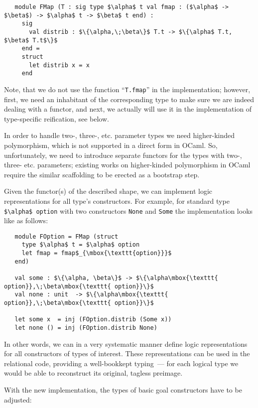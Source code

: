\begin{lstlisting}
   module FMap (T : sig type $\alpha$ t val fmap : ($\alpha$ -> $\beta$) -> $\alpha$ t -> $\beta$ t end) :
     sig
       val distrib : $\{\alpha,\;\beta\}$ T.t -> $\{\alpha$ T.t, $\beta$ T.t$\}$
     end =
     struct
       let distrib x = x
     end
\end{lstlisting}

Note, that we do not use the function ``\lstinline{T.fmap}'' in the implementation; however, first, we need an inhabitant of the
corresponding type to make sure we are indeed dealing with a functor, and next, we actually will use it in the
implementation of type-specific reification, see below.

In order to handle two-, three-, etc. parameter types we need higher-kinded polymorphism, which is
not supported in a direct form in OCaml. So, unfortunately, we need to introduce separate
functors for the types with two-, three- etc. parameters; existing works on higher-kinded
polymorphism in OCaml~\cite{HKinded} require the similar scaffolding to be erected as a bootstrap step.

Given the functor(s) of the described shape, we can implement logic representations for
all type's constructors. For example, for standard type \lstinline|$\alpha$ option| with two constructors
\lstinline|None| and \lstinline|Some| the implementation looks like as follows:

\begin{lstlisting}
   module FOption = FMap (struct
     type $\alpha$ t = $\alpha$ option
     let fmap = fmap$_{\mbox{\texttt{option}}}$
   end)

   val some : $\{\alpha, \beta\}$ -> $\{\alpha\mbox{\texttt{ option}},\;\beta\mbox{\texttt{ option}}\}$
   val none : unit  -> $\{\alpha\mbox{\texttt{ option}},\;\beta\mbox{\texttt{ option}}\}$

   let some x  = inj (FOption.distrib (Some x))
   let none () = inj (FOption.distrib None)
\end{lstlisting}

In other words, we can in a very systematic manner define logic representations for all constructors
of types of interest. These representations can be used in the relational code, providing a well-bookkept
typing~--- for each logical type we would be able to reconstruct its original, tagless preimage.

With the new implementation, the types of basic goal constructors have to be adjusted:

